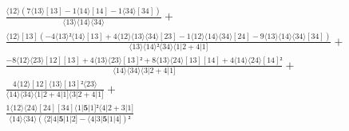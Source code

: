 \documentclass[varwidth, border=5pt]{standalone}
\begin{document}
\begin{my}
$\begin{gathered}
\scriptscriptstyle\frac{⟨12⟩(7⟨13⟩[13]-1⟨14⟩[14]-1⟨34⟩[34])}{⟨13⟩⟨14⟩⟨34⟩} +\\
\scriptscriptstyle\frac{⟨12⟩[13](-4⟨13⟩²⟨14⟩[13]+4⟨12⟩⟨13⟩⟨34⟩[23]-1⟨12⟩⟨14⟩⟨34⟩[24]-9⟨13⟩⟨14⟩⟨34⟩[34])}{⟨13⟩⟨14⟩²⟨34⟩⟨1|2+4|1]} +\\
\scriptscriptstyle\frac{-8⟨12⟩⟨23⟩[12][13]+4⟨13⟩⟨23⟩[13]²+8⟨13⟩⟨24⟩[13][14]+4⟨14⟩⟨24⟩[14]²}{⟨14⟩⟨34⟩⟨3|2+4|1]} +\\
\scriptscriptstyle\frac{4⟨12⟩[12]⟨13⟩[13]²⟨23⟩}{⟨14⟩⟨34⟩⟨1|2+4|1]⟨3|2+4|1]} +\\
\scriptscriptstyle\frac{1⟨12⟩⟨24⟩[24][34]⟨1|𝟓|1]²⟨4|2+3|1]}{⟨14⟩⟨34⟩(⟨2|4|𝟓|1|2]-⟨4|3|𝟓|1|4])²} \phantom{+}
\end{gathered}$
\end{my}
\end{document}
